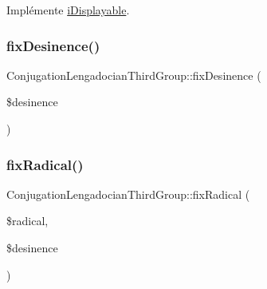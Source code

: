 Implémente \hyperlink{interfacei_displayable_a0264fd455c876e897f754cf85f1681ca}{i\+Displayable}.

\hypertarget{class_conjugation_lengadocian_third_group_a6c1f315bacb649a252e5058a28f46141}{}\label{class_conjugation_lengadocian_third_group_a6c1f315bacb649a252e5058a28f46141} 
\subsubsection{\texorpdfstring{fix\+Desinence()}{fixDesinence()}}
{\footnotesize\ttfamily Conjugation\+Lengadocian\+Third\+Group\+::fix\+Desinence (\begin{DoxyParamCaption}\item[{}]{\$desinence }\end{DoxyParamCaption})\hspace{0.3cm}{\ttfamily [protected]}}

\hypertarget{class_conjugation_lengadocian_third_group_a24ef94ab2752b9ab2eadbefda6ddd959}{}\label{class_conjugation_lengadocian_third_group_a24ef94ab2752b9ab2eadbefda6ddd959} 
\subsubsection{\texorpdfstring{fix\+Radical()}{fixRadical()}}
{\footnotesize\ttfamily Conjugation\+Lengadocian\+Third\+Group\+::fix\+Radical (\begin{DoxyParamCaption}\item[{}]{\$radical,  }\item[{}]{\$desinence }\end{DoxyParamCaption})\hspace{0.3cm}{\ttfamily [protected]}}

\hypertarget{class_conjugation_lengadocian_third_group_a11aedf41cff74c08a1bfd25ac5ce8709}{}\label{class_conjugation_lengadocian_third_group_a11aedf41cff74c08a1bfd25ac5ce8709} 
